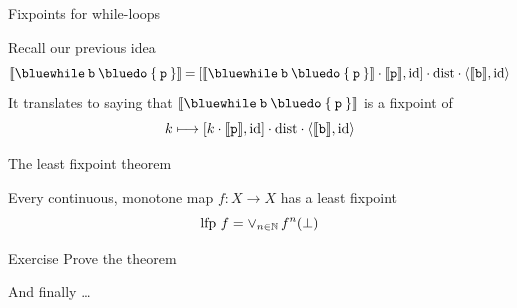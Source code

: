 \documentclass{beamer}
\begin{document}
\begin{frame}{Fixpoints for while-loops}

        \begin{center}
        \end{center}

        \pause
        \vfill
        Recall our previous idea
        \[
                \sem{\mathtt{{\blue while} \> b \> {\blue do} \> \{ \> p \> \}} }
                                                         \> {=} \>
                [\sem{\mathtt{{\blue while} \> b \> {\blue do} \> \{ \> p \> \}} } \comp 
                \sem{\prog{p}},\id] \comp
                \mathrm{dist} \comp \pv{\sem{\prog{b}}}{\id}
        \]
        It translates to saying that $\sem{\mathtt{{\blue while} \> b \> {\blue do} \> \{ \> p \> \}} }$ is
        a fixpoint of 
        \[
               k \longmapsto 
               [k \cdot 
               \llbracket \mathtt{p} \rrbracket,\mathrm{id}] \cdot
               \mathrm{dist} \cdot \langle \llbracket \mathtt{b} \rrbracket, \mathrm{id} \rangle
        \]
\end{frame}

\begin{frame}{The least fixpoint theorem}
        
        \begin{theorem}
        Every continuous, monotone map $f : X \to X$ has
        a least fixpoint
        \[
                \mathrm{lfp}\ f = \vee_{n \in \mathbb{N}}\, f^n(\bot)
        \]
        \end{theorem}

        \begin{block}{Exercise}
                Prove the theorem
        \end{block}

        \bigskip
        \pause
        And finally \dots
\end{frame}
\end{document}
